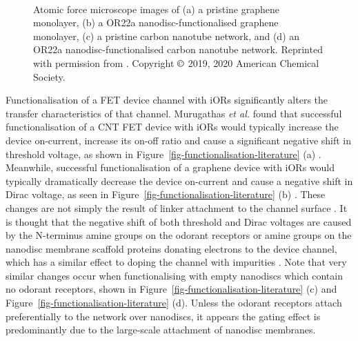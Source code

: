 \documentclass[
  a4paper,
]{scrbook}
\begin{document}
\begin{figure}
\begin{minipage}[t]{0.45\linewidth}
\end{minipage}%
%
\begin{minipage}[t]{0.01\linewidth}

{\centering 

~

}

\end{minipage}%

\caption[Atomic force microscope images of pristine and
nanodisc-functionalised
thin-films.]{\label{fig-functionalisation-AFM-literature}Atomic force
microscope images of (a) a pristine graphene monolayer, (b) a OR22a
nanodisc-functionalised graphene monolayer, (c) a pristine carbon
nanotube network, and (d) an OR22a nanodisc-functionalised carbon
nanotube network. Reprinted with permission from
\autocite{Murugathas2019a,Murugathas2020}. Copyright \(\copyright\)
2019, 2020 American Chemical Society.}

\end{figure}

Functionalisation of a FET device channel with iORs significantly alters
the transfer characteristics of that channel. Murugathas \emph{et al.}
found that successful functionalisation of a CNT FET device with iORs
would typically increase the device on-current, increase its on-off
ratio and cause a significant negative shift in threshold voltage, as
shown in Figure~\ref{fig-functionalisation-literature} (a)
\autocite{Murugathas2019a}. Meanwhile, successful functionalisation of a
graphene device with iORs would typically dramatically decrease the
device on-current and cause a negative shift in Dirac voltage, as seen
in Figure~\ref{fig-functionalisation-literature} (b)
\autocite{Murugathas2020}. These changes are not simply the result of
linker attachment to the channel surface \autocite{Murugathas2019a}. It
is thought that the negative shift of both threshold and Dirac voltages
are caused by the N-terminus amine groups on the odorant receptors or
amine groups on the nanodisc membrane scaffold proteins donating
electrons to the device channel, which has a similar effect to doping
the channel with impurities
\autocite{Bradley2004,Murugathas2019a,Murugathas2020}. Note that very
similar changes occur when functionalising with empty nanodiscs which
contain no odorant receptors, shown in
Figure~\ref{fig-functionalisation-literature} (c) and
Figure~\ref{fig-functionalisation-literature} (d). Unless the odorant
receptors attach preferentially to the network over nanodiscs, it
appears the gating effect is predominantly due to the large-scale
attachment of nanodisc membranes.
\end{document}
